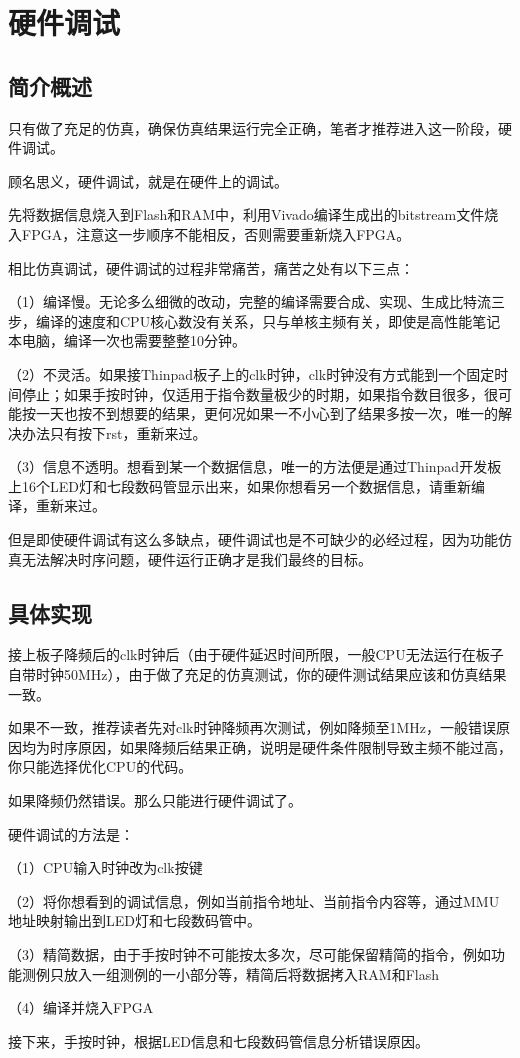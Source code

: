 \chapter{硬件调试}

\section{简介概述}

只有做了充足的仿真，确保仿真结果运行完全正确，笔者才推荐进入这一阶段，硬件调试。

顾名思义，硬件调试，就是在硬件上的调试。

先将数据信息烧入到Flash和RAM中，利用Vivado编译生成出的bitstream文件烧入FPGA，注意这一步顺序不能相反，否则需要重新烧入FPGA。

相比仿真调试，硬件调试的过程非常痛苦，痛苦之处有以下三点：

（1）编译慢。无论多么细微的改动，完整的编译需要合成、实现、生成比特流三步，编译的速度和CPU核心数没有关系，只与单核主频有关，即使是高性能笔记本电脑，编译一次也需要整整10分钟。

（2）不灵活。如果接Thinpad板子上的clk时钟，clk时钟没有方式能到一个固定时间停止；如果手按时钟，仅适用于指令数量极少的时期，如果指令数目很多，很可能按一天也按不到想要的结果，更何况如果一不小心到了结果多按一次，唯一的解决办法只有按下rst，重新来过。

（3）信息不透明。想看到某一个数据信息，唯一的方法便是通过Thinpad开发板上16个LED灯和七段数码管显示出来，如果你想看另一个数据信息，请重新编译，重新来过。

但是即使硬件调试有这么多缺点，硬件调试也是不可缺少的必经过程，因为功能仿真无法解决时序问题，硬件运行正确才是我们最终的目标。

\section{具体实现}

接上板子降频后的clk时钟后（由于硬件延迟时间所限，一般CPU无法运行在板子自带时钟50MHz），由于做了充足的仿真测试，你的硬件测试结果应该和仿真结果一致。

如果不一致，推荐读者先对clk时钟降频再次测试，例如降频至1MHz，一般错误原因均为时序原因，如果降频后结果正确，说明是硬件条件限制导致主频不能过高，你只能选择优化CPU的代码。

如果降频仍然错误。那么只能进行硬件调试了。

硬件调试的方法是：

（1）CPU输入时钟改为clk按键

（2）将你想看到的调试信息，例如当前指令地址、当前指令内容等，通过MMU地址映射输出到LED灯和七段数码管中。

（3）精简数据，由于手按时钟不可能按太多次，尽可能保留精简的指令，例如功能测例只放入一组测例的一小部分等，精简后将数据拷入RAM和Flash

（4）编译并烧入FPGA

接下来，手按时钟，根据LED信息和七段数码管信息分析错误原因。